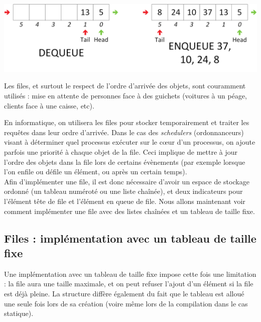\begin{center}
\includegraphics[scale=0.65]{Cours/Files_2_Structure_Generale_Usage_pack_3.png}
\end{center}

\smallskip

Les files, et surtout le respect de l'ordre d'arrivée des objets, sont couramment utilisés : mise en attente de personnes face à des guichets (voitures à un péage, clients face à une caisse, etc).

En informatique, on utilisera les files pour stocker temporairement et traiter les requêtes dans leur ordre d'arrivée.
Dans le cas des \textit{schedulers} (ordonnanceurs) visant à déterminer quel processus exécuter sur le c\oe{}ur d'un processus, on ajoute parfois une priorité à chaque objet de la file.
Ceci implique de mettre à jour l'ordre des objets dans la file lors de certains évènements (par exemple lorsque l'on enfile ou défile un élément, ou après un certain temps).\\

Afin d'implémenter une file, il est donc nécessaire d'avoir un espace de stockage ordonné (un tableau numéroté ou une liste chaînée), et deux indicateurs pour l'élément tête de file et l'élément en queue de file.
Nous allons maintenant voir comment implémenter une file avec des listes chaînées et un tableau de taille fixe.

\bigskip


\subsection{Files : implémentation avec un tableau de taille fixe}

\bigskip

Une implémentation avec un tableau de taille fixe impose cette fois une limitation : la file aura une taille maximale, et on peut refuser l'ajout d'un élément si la file est déjà pleine.
La structure diffère également du fait que le tableau est alloué une seule fois lors de sa création (voire même lors de la compilation dans le cas statique).

